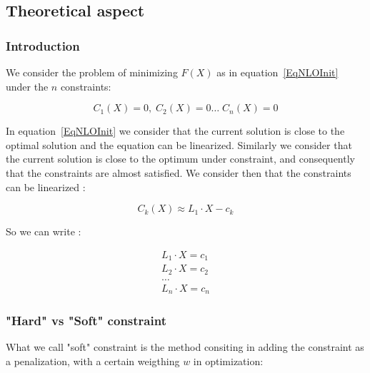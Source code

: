 \subsection{Theoretical aspect}


\subsubsection{Introduction}

We consider the problem of minimizing $F(X)$ as in equation~\ref{EqNLOInit} under
the $n$ constraints:

\begin{equation}
	C_1(X) =0, \; C_2(X)=0 \dots \;  C_n(X)=0
\end{equation}

In  equation~\ref{EqNLOInit} we consider that the current solution is
close to the optimal solution and the equation can be linearized.
Similarly we consider that the current solution is close to the 
optimum under constraint, and consequently that the constraints are almost satisfied.
We consider then that the constraints can be linearized :

\begin{equation} 
C_k(X) \approx L_1 \cdot X  - c_k
\end{equation} 

So we can write :

\begin{equation} 
\begin{split}
  L_1 \cdot X = c_1 \\
  L_2 \cdot X = c_2 \\
    \dots \\
  L_n \cdot X = c_n 
\end{split}
\end{equation}


\subsubsection{"Hard" vs "Soft" constraint}

What we call "soft" constraint is the method consiting in adding
the constraint as a penalization, with a certain weigthing $w$  in optimization:

